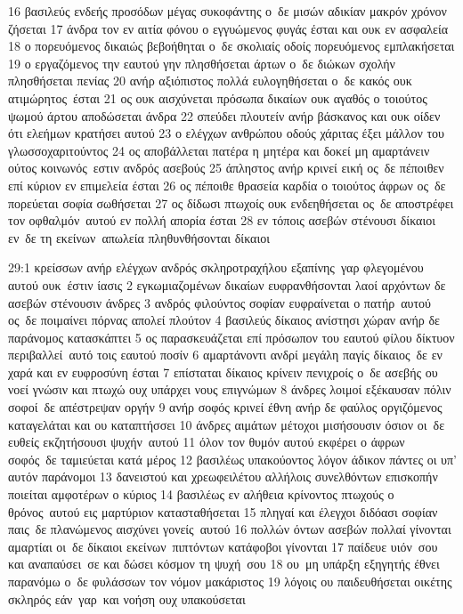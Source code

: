 \documentclass[10pt,oneside,footinclude=true,headinclude=true]{scrbook} %
\begin{document}
16 βασιλεύς ενδεής προσόδων μέγας συκοφάντης ο δε μισών αδικίαν μακρόν χρόνον ζήσεται
17 άνδρα τον εν αιτία φόνου ο εγγυώμενος φυγάς έσται και ουκ εν ασφαλεία
18 ο πορευόμενος δικαιώς βεβοήθηται ο δε σκολιαίς οδοίς πορευόμενος εμπλακήσεται
19 ο εργαζόμενος την εαυτού γην πλησθήσεται άρτων ο δε διώκων σχολήν πλησθήσεται πενίας
20 ανήρ αξιόπιστος πολλά ευλογηθήσεται ο δε κακός ουκ ατιμώρητος έσται
21 ος ουκ αισχύνεται πρόσωπα δικαίων ουκ αγαθός ο τοιούτος ψωμού άρτου αποδώσεται άνδρα
22 σπεύδει πλουτείν ανήρ βάσκανος και ουκ οίδεν ότι ελεήμων κρατήσει αυτού
23 ο ελέγχων ανθρώπου οδούς χάριτας έξει μάλλον του γλωσσοχαριτούντος
24 ος αποβάλλεται πατέρα η μητέρα και δοκεί μη αμαρτάνειν ούτος κοινωνός εστιν ανδρός ασεβούς
25 άπληστος ανήρ κρινεί εική ος δε πέποιθεν επί κύριον εν επιμελεία έσται
26 ος πέποιθε θρασεία καρδία ο τοιούτος άφρων ος δε πορεύεται σοφία σωθήσεται
27 ος δίδωσι πτωχοίς ουκ ενδεηθήσεται ος δε αποστρέφει τον οφθαλμόν αυτού εν πολλή απορία έσται
28 εν τόποις ασεβών στένουσι δίκαιοι εν δε τη εκείνων απωλεία πληθυνθήσονται δίκαιοι
\par
29:1 κρείσσων ανήρ ελέγχων ανδρός σκληροτραχήλου εξαπίνης γαρ φλεγομένου αυτού ουκ έστιν ίασις
2 εγκωμιαζομένων δικαίων ευφρανθήσονται λαοί αρχόντων δε ασεβών στένουσιν άνδρες
3 ανδρός φιλούντος σοφίαν ευφραίνεται ο πατήρ αυτού ος δε ποιμαίνει πόρνας απολεί πλούτον
4 βασιλεύς δίκαιος ανίστησι χώραν ανήρ δε παράνομος κατασκάπτει
5 ος παρασκευάζεται επί πρόσωπον του εαυτού φίλου δίκτυον περιβαλλεί αυτό τοις εαυτού ποσίν
6 αμαρτάνοντι ανδρί μεγάλη παγίς δίκαιος δε εν χαρά και εν ευφροσύνη έσται
7 επίσταται δίκαιος κρίνειν πενιχροίς ο δε ασεβής ου νοεί γνώσιν και πτωχώ ουχ υπάρχει νους επιγνώμων
8 άνδρες λοιμοί εξέκαυσαν πόλιν σοφοί δε απέστρεψαν οργήν
9 ανήρ σοφός κρινεί έθνη ανήρ δε φαύλος οργιζόμενος καταγελάται και ου καταπτήσσει
10 άνδρες αιμάτων μέτοχοι μισήσουσιν όσιον οι δε ευθείς εκζητήσουσι ψυχήν αυτού
11 όλον τον θυμόν αυτού εκφέρει ο άφρων σοφός δε ταμιεύεται κατά μέρος
12 βασιλέως υπακούοντος λόγον άδικον πάντες οι υπ' αυτόν παράνομοι
13 δανειστού και χρεωφειλέτου αλλήλοις συνελθόντων επισκοπήν ποιείται αμφοτέρων ο κύριος
14 βασιλέως εν αλήθεια κρίνοντος πτωχούς ο θρόνος αυτού εις μαρτύριον κατασταθήσεται
15 πληγαί και έλεγχοι διδόασι σοφίαν παις δε πλανώμενος αισχύνει γονείς αυτού
16 πολλών όντων ασεβών πολλαί γίνονται αμαρτίαι οι δε δίκαιοι εκείνων πιπτόντων κατάφοβοι γίνονται
17 παίδευε υιόν σου και αναπαύσει σε και δώσει κόσμον τη ψυχή σου
18 ου μη υπάρξη εξηγητής έθνει παρανόμω ο δε φυλάσσων τον νόμον μακάριστος
19 λόγοις ου παιδευθήσεται οικέτης σκληρός εάν γαρ και νοήση ουχ υπακούσεται
\end{document}
